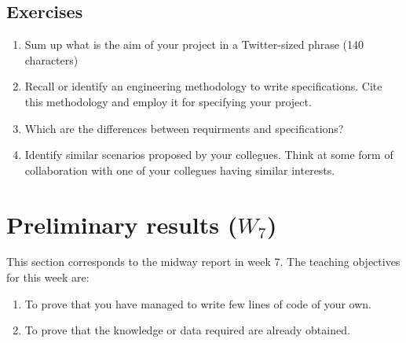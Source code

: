\documentclass[a4paper,12pt]{report}
\begin{document}
\section{Exercises}
\begin{enumerate}
\item Sum up what is the aim of your project in a Twitter-sized phrase (140 characters)
\item Recall or identify an engineering methodology to write specifications. 
 Cite this methodology and employ it for specifying your project.
 \item Which are the differences between requirments and specifications? 
 \item Identify similar scenarios proposed by your collegues. 
 Think at some form of collaboration with one of your collegues having similar interests.
\end{enumerate}

\vspace{0.5cm}

\vspace{0.5cm}

\vspace{0.5cm}

\vspace{0.5cm}



\chapter{Preliminary results ($W_7$)}
This section corresponds to the midway report in week 7.
The teaching objectives for this week are:
\begin{enumerate}
 \item To prove that you have managed to write few lines of code of your own.
\item To prove that the knowledge or data required are already obtained.
\end{enumerate}
\end{document}

